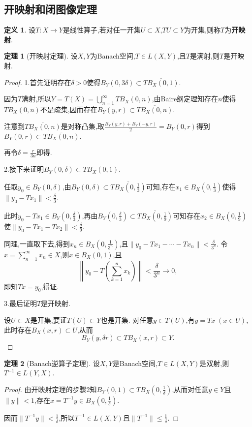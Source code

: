 \documentclass{ctexart}
\theoremstyle{definition}
\newtheorem{definition}{定义}
\newtheorem{theorem}{定理}
\theoremstyle{remark}
\begin{document}
	\subsection{开映射和闭图像定理}
	
	\begin{definition}
		设$T:X\to Y$是线性算子,若对任一开集$U\subset X$,$TU\subset Y$为开集,则称$T$为\textbf{开映射}.
	\end{definition}
	\begin{theorem}[开映射定理]
		设$X,Y$为Banach空间,$T\in L(X,Y)$,且$T$是满射,则$T$是开映射.
	\end{theorem}
	\begin{proof}
		1.首先证明存在$\delta>0$使得$B_Y(0,3\delta)\subset\overline{TB_X(0,1)}$.
			
		因为$T$满射,所以$Y=T(X)=\bigcup_{n=1}^\infty{TB_X(0,n)}$,由Baire纲定理知存在$n$使得$TB_X(0,n)$不是疏集,因而存在$B_Y(y,r)\subset\overline{TB_X(0,n)}$.
			
		注意到$\overline{TB_X(0,n)}$是对称凸集,取$\frac{B_Y(y,r)+B_Y(-y,r)}{2}=B_Y(0,r)$得到$B_Y(0,r)\subset\overline{TB_X(0,n)}$.
			
		再令$\delta=\frac{r}{3n}$即得.
			
		2.接下来证明$B_Y(0,\delta)\subset TB_X(0,1)$.
		
		任取$y_0\in B_Y(0,\delta)$,由$B_Y(0,\delta)\subset\overline{TB_X(0,\frac{1}{3})}$可知,存在$x_1\in B_X(0,\frac{1}{3})$使得$\|y_0-Tx_1\|<\frac{\delta}{3}$.
		
		此时$y_0-Tx_1\in B_Y(0,\frac{\delta}{3})$,再由$B_Y(0,\frac{\delta}{3})\subset\overline{TB_X(0,\frac{1}{9})}$可知存在$x_2\in B_X(0,\frac{1}{9})$使$\|y_0-Tx_1-Tx_2\|<\frac{\delta}{9}$.
		
		同理,一直取下去,得到$x_n\in B_X(0,\frac{1}{3^n})$,且$\|y_0-Tx_1-\cdots-Tx_n\|<\frac{\delta}{3^n}$.
		令$x=\sum_{n=1}^\infty{x_n}\in X$,则$x\in B_X(0,1)$,且
		$$\left\|y_0-T\left(\sum_{k=1}^n{x_k}\right)\right\|<\frac{\delta}{3^n}\to 0,$$
		即知$Tx=y_0$,得证.
		
		3.最后证明$T$是开映射.
		
		设$U\subset X$是开集,要证$T(U)\subset Y$也是开集.
		对任意$y\in T(U)$,有$y=Tx\;(x\in U)$,此时存在$B_X(x,r)\subset U$,从而
		$$B_Y(y,\delta r)\subset TB_X(x,r)\subset Y.$$
	\end{proof}
	
	\begin{theorem}[Banach逆算子定理]
		设$X,Y$是Banach空间,$T\in L(X,Y)$是双射,则$T^{-1}\in L(Y,X)$.
	\end{theorem}
	\begin{proof}
		由开映射定理的步骤2知$B_Y(0,1)\subset TB_X(0,\frac{1}{\delta})$,从而对任意$y\in Y$且$\|y\|<1$,存在$x=T^{-1}y\in B_X(0,\frac{1}{\delta})$.
		
		因而$\|T^{-1}y\|<\frac{1}{\delta}$,所以$T^{-1}\in L(X,Y)$且$\|T^{-1}\|\le\frac{1}{\delta}$.
	\end{proof}
	
\end{document}
